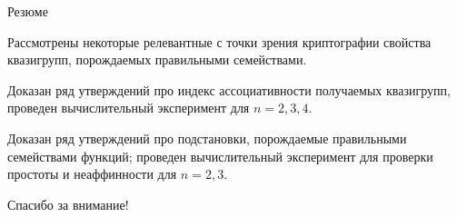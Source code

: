 \begin{frame}{Резюме}
    \begin{coloritemize}
        \item Рассмотрены некоторые релевантные с точки зрения криптографии свойства квазигрупп, порождаемых правильными семействами.
        \pause 
        \item Доказан ряд утверждений про индекс ассоциативности получаемых квазигрупп, проведен вычислительный эксперимент для $n = 2, 3, 4$.
        \pause 
        \item Доказан ряд утверждений про подстановки, порождаемые правильными семействами функций; проведен вычислительный эксперимент для проверки простоты и неаффинности для $n = 2, 3$.
    \end{coloritemize}
\end{frame}


\begin{frame}
    \begin{center}
        {\Huge Спасибо за внимание!}
    \end{center}
\end{frame}
